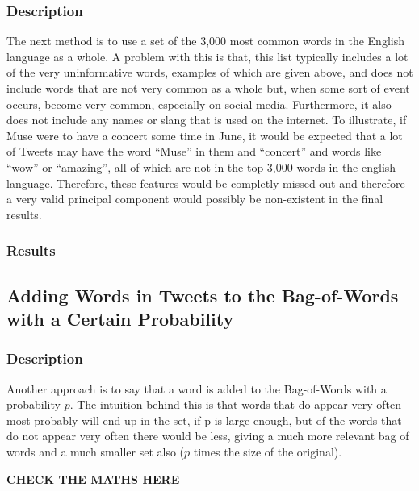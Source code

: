 \documentclass[11pt,a4paper]{article}
\begin{document}
\subsubsection{Description}
The next method is to use a set of the 3,000 most common words in the English language as a whole. A problem with this is that, this list typically includes a lot of the very uninformative words, examples of which are given above, and does not include words that are not very common as a whole but, when some sort of event occurs, become very common, especially on social media. Furthermore, it also does not include any names or slang that is used on the internet. To illustrate, if Muse were to have a concert some time in June, it would be expected that a lot of Tweets may have the word ``Muse'' in them and ``concert'' and words like ``wow'' or ``amazing'', all of which are not in the top 3,000 words in the english language. Therefore, these features would be completly missed out and therefore a very valid principal component would possibly be non-existent in the final results.

\subsubsection{Results}
\subsection{Adding Words in Tweets to the Bag-of-Words with a Certain Probability}
\subsubsection{Description}
Another approach is to say that a word is added to the Bag-of-Words with a probability $p$. The intuition behind this is that words that do appear very often most probably will end up in the set, if p is large enough, but of the words that do not appear very often there would be less, giving a much more relevant bag of words and a much smaller set also ($p$ times the size of the original).


\textbf{CHECK THE MATHS HERE}
\end{document}
